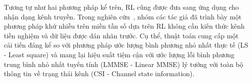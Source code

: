 Tương tự như hai phương pháp kể trên, RL cũng được đưa sang ứng dụng cho nhận dạng kênh truyền. Trong nghiên cứu~\cite{Oh2021}, nhóm các tác giả đã trình bày một phương pháp khử nhiễu trên miền tần số dựa trên RL không cần kiến thức kênh tiền nghiệm và dữ liệu được dán nhãn trước. Cụ thể, thuật toán cung cấp một cải tiến đáng kể so với phương pháp ước lượng bình phương nhỏ nhất thực tế (LS - Least square) và mang lại hiệu suất tiệm cận với ước lượng lỗi bình phương trung bình nhỏ nhất tuyến tính (LMMSE - Linear MMSE) lý tưởng với toàn bộ thông tin về trạng thái kênh (CSI - Channel state information).